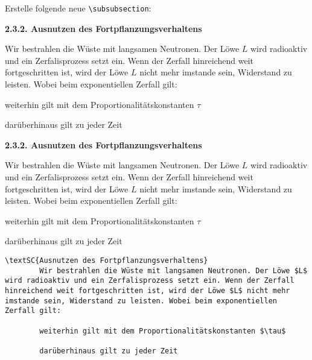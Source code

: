 \documentclass["WS\space 16-17\space -\space LaTeX-Kurs\space -\space Praesentation\space -\space 1.tex"]{subfiles}
\begin{document}
\begin{frame}[fragile]
	\Aufgabee
		Erstelle folgende neue \lstinline[basicstyle=\normalfont\normalsize]|\subsubsection|:
	\begin{outputbox}
	    { \large\textbf{2.3.2. Ausnutzen des Fortpflanzungsverhaltens} } 
	
	    Wir bestrahlen die Wüste mit langsamen Neutronen. Der Löwe $L$ wird radioaktiv und ein Zerfalisprozess setzt ein. Wenn der Zerfall hinreichend weit fortgeschritten ist, wird der Löwe $L$ nicht mehr imstande sein, Widerstand zu leisten. Wobei beim exponentiellen Zerfall gilt:
	
	    weiterhin gilt mit dem Proportionalitätskonstanten $\tau$
	
	    darüberhinaus gilt zu jeder Zeit	
    \end{outputbox}
	\vspace{0.3cm}
\end{frame}
\begin{frame}[fragile]
	\vspace{-0.2cm}\Losung
	\begin{outputbox}
	    { \large\textbf{2.3.2. Ausnutzen des Fortpflanzungsverhaltens} } 
	
	    Wir bestrahlen die Wüste mit langsamen Neutronen. Der Löwe $L$ wird radioaktiv und
	    ein Zerfalisprozess setzt ein. Wenn der Zerfall hinreichend weit fortgeschritten ist, wird der Löwe $L$ nicht mehr imstande sein, Widerstand zu leisten. Wobei beim exponentiellen Zerfall gilt:
	
	    weiterhin gilt mit dem Proportionalitätskonstanten $\tau$
	
	    darüberhinaus gilt zu jeder Zeit
	    \vspace{-0.1cm}
	\end{outputbox}

	\vspace{-0.1cm}\Code
	\begin{lstlisting}[gobble=4]
    \textSC{Ausnutzen des Fortpflanzungsverhaltens}  
	    Wir bestrahlen die Wüste mit langsamen Neutronen. Der Löwe $L$ wird radioaktiv und ein Zerfalisprozess setzt ein. Wenn der Zerfall hinreichend weit fortgeschritten ist, wird der Löwe $L$ nicht mehr imstande sein, Widerstand zu leisten. Wobei beim exponentiellen Zerfall gilt:

	    weiterhin gilt mit dem Proportionalitätskonstanten $\tau$

	    darüberhinaus gilt zu jeder Zeit
	\end{lstlisting}
\end{frame}
\end{document}

